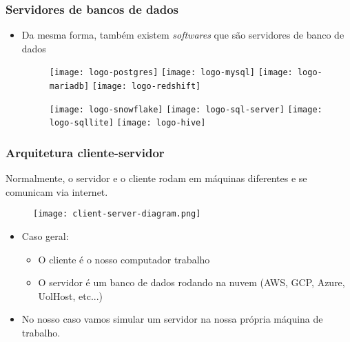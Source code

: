 \documentclass[t, 10pt, aspectratio=169, table, x11names]{beamer}
\begin{document}
	\begin{frame}
		\frametitle{Servidores de bancos de dados}
		\begin{itemize}
			\item[] Da mesma forma, também existem \textit{softwares} que são servidores de banco de dados
			\begin{figure}
				\vspace{6mm}
				\centering
				\texttt{[image: logo-postgres]}
				\hspace{5mm}
				\texttt{[image: logo-mysql]}
				\hspace{5mm}
				\texttt{[image: logo-mariadb]}
				\hspace{5mm}
				\texttt{[image: logo-redshift]}
			\end{figure}
			\begin{figure}
				\vspace{6mm}
				\centering
				\texttt{[image: logo-snowflake]}
				\hspace{5mm}
				\texttt{[image: logo-sql-server]}
				\hspace{5mm}
				\texttt{[image: logo-sqllite]}
				\hspace{5mm}
				\texttt{[image: logo-hive]}
			\end{figure}
		\end{itemize}
	\end{frame}

	\begin{frame}
		\frametitle{Arquitetura cliente-servidor}
		Normalmente, o servidor e o cliente rodam em máquinas diferentes e se comunicam via internet. 
		\begin{figure}[h]
			\texttt{[image: client-server-diagram.png]}
		\end{figure}
		\begin{itemize}
			\item[] Caso geral:
			\begin{itemize}
				\item O cliente é o nosso computador trabalho
				\item O servidor é um banco de dados rodando na nuvem (AWS, GCP, Azure, UolHost, etc...)
			\end{itemize}
			\vspace{2mm}
			\item[] No nosso caso vamos simular um servidor na nossa própria máquina de trabalho. 
		\end{itemize}
	\end{frame}
\end{document}
